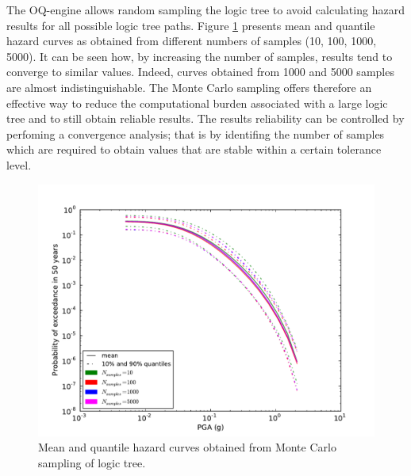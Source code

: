 The OQ-engine allows random sampling the logic tree to avoid calculating hazard results for all possible
logic tree paths. Figure \ref{fig:logic_tree_curves} presents mean and quantile hazard curves
as obtained from different numbers of samples (10, 100, 1000, 5000). It can be seen how, by increasing the number
of samples, results tend to converge to similar values. Indeed, curves obtained from 1000 and 5000 samples are almost indistinguishable. The Monte Carlo sampling offers therefore an effective way to reduce the computational burden associated with a large logic tree and to still obtain reliable results. The results reliability can be controlled by perfoming a convergence analysis; that is by identifing the number of samples
which are required to obtain values that are stable within a certain tolerance level.
\begin{figure}
\centering
\includegraphics[width=14cm]{./Pictures/LogicTreeCurves.pdf}
\caption{Mean and quantile hazard curves obtained from Monte Carlo sampling of logic tree.}
\label{fig:logic_tree_curves}
\end{figure}

